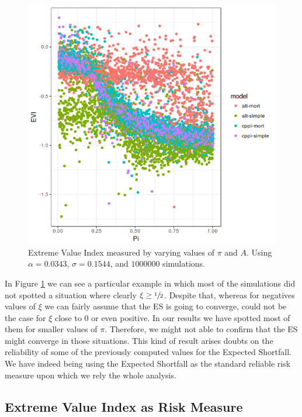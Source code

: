 \begin{figure}[h]
    \centering
    \includegraphics[scale=0.75]{images/evi-pi_new.png}
    \caption{Extreme Value Index measured by varying values of $\pi$ and $A$.  Using $\alpha = 0.0343$, $\sigma = 0.1544$, and $1000000$ simulations.}
    \label{fig:evi-pi}
\end{figure}

In Figure \ref{fig:evi-pi} we can see a particular example in which most of the simulations did not spotted a situation where clearly $\xi \geq \sfrac{1}{2}$. Despite that, whereas for negatives values of $\xi$ we can fairly assume that the ES is going to converge, could not be the case for $\xi$ close to $0$ or even positive. In our results we have spotted most of them for smaller values of $\pi$. Therefore, we might not able to confirm that the ES might converge in those situations. This kind of result arises doubts on the reliability of some of the previously computed values for the Expected Shortfall. We have indeed being using the Expected Shortfall as the standard reliable risk measure upon which we rely the whole analysis.


\subsection{Extreme Value Index as Risk Measure}

